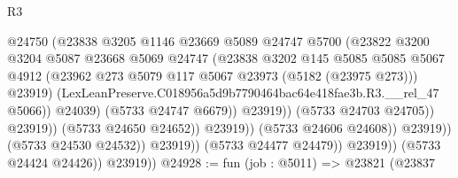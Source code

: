 \begin{lexlean}{R3}
\begin{coremodule}
                                              @24750
                                              (@23838
                                                @3205
                                                @1146
                                                @23669
                                                @5089
                                                @24747
                                                @5700
                                                (@23822
                                                  @3200
                                                  @3204
                                                  @5087
                                                  @23668
                                                  @5069
                                                  @24747
                                                  (@23838
                                                    @3202
                                                    @145
                                                    @5085
                                                    @5085
                                                    @5067
                                                    @4912
                                                    (@23962
                                                      @273
                                                      @5079
                                                      @117
                                                      @5067
                                                      @23973
                                                      (@5182 (@23975 @273)))
                                                    @23919)
                                                  (LexLeanPreserve.C018956a5d9b7790464bac64e418fae3b.R3.__rel_47
                                                    @5066))
                                                @24039)
                                              (@5733 @24747 @6679))
                                            @23919))
                                        (@5733 @24703 @24705))
                                      @23919))
                                  (@5733 @24650 @24652))
                                @23919))
                            (@5733 @24606 @24608))
                          @23919))
                      (@5733 @24530 @24532))
                    @23919))
                (@5733 @24477 @24479))
              @23919))
          (@5733 @24424 @24426))
        @23919))
@24928 := fun (job : @5011) =>
  @23821
    (@23837

\end{coremodule}
\end{lexlean}
